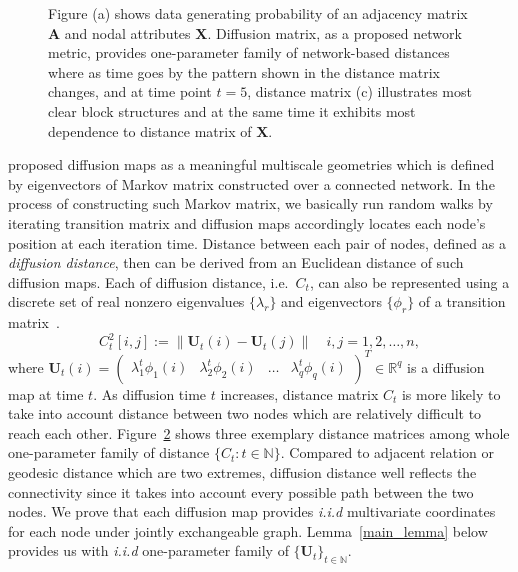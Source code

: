 \documentclass[11pt]{article}
\theoremstyle{definition}
\begin{document}
\begin{figure}[ht]
\begin{subfigure}[b]{0.23\textwidth}
		\caption{}
		\label{fig:d}
	\end{subfigure}
	\caption{Figure (a) shows data generating probability of an adjacency matrix $\mathbf{A}$ and nodal attributes $\mathbf{X}$. Diffusion matrix, as a proposed network metric, provides one-parameter family of network-based distances where as time goes by the pattern shown in the distance matrix changes, and at time point $t = 5$, distance matrix (c) illustrates most clear block structures and at the same time it exhibits most dependence to distance matrix of $\mathbf{X}$.}
	\label{fig:diffusions}
\end{figure}
\cite{coifman2006diffusion} proposed diffusion maps as a meaningful multiscale geometries which is defined by eigenvectors of Markov matrix constructed over a connected network. In the process of constructing such Markov matrix, we basically run random walks by iterating transition matrix and diffusion maps accordingly locates each node's position at each iteration time. Distance between each pair of nodes, defined as a \textit{diffusion distance}, then can be derived from an Euclidean distance of such diffusion maps. Each of diffusion distance, i.e.~$C_{t}$, can also be represented using a discrete set of real nonzero eigenvalues $\{ \lambda_{r} \}$ and eigenvectors $\{ \phi_{r}  \}$ of a transition matrix~\citep{coifman2006diffusion,lafon2006diffusion}. 
\begin{equation}
\label{eq:diffusion}
C^2_{t}[i,j]  :=   \parallel \mathbf{U}_{t}(i) - \mathbf{U}_{t}(j) \parallel   \quad i,j = 1,2, \ldots , n,
\end{equation}
where $\mathbf{U}_{t}(i) = \begin{pmatrix} \lambda^{t}_{1} \phi_{1}(i) & \lambda^{t}_{2} \phi_{2} (i)  & \ldots & \lambda^{t}_{q} \phi_{q}(i) \end{pmatrix}^{T} \in \mathbb{R}^{q}$ is a diffusion map at time $t$. As diffusion time $t$ increases, distance matrix $C_{t}$ is more likely to take into account distance between two nodes which are relatively difficult to reach each other. Figure~\ref{fig:diffusions} shows three exemplary distance matrices among whole one-parameter family of distance $\{ C_{t} : t \in \mathbb{N} \}$. Compared to adjacent relation or geodesic distance which are two extremes, diffusion distance well reflects the connectivity since it takes into account every possible path between the two nodes. We prove that each diffusion map provides \textit{i.i.d} multivariate coordinates for each node under jointly exchangeable graph. Lemma~\ref{main_lemma} below provides us with \textit{i.i.d} one-parameter family of $\{ \mathbf{U}_{t} \}_{t \in \mathbb{N}}$. 
\end{document}
